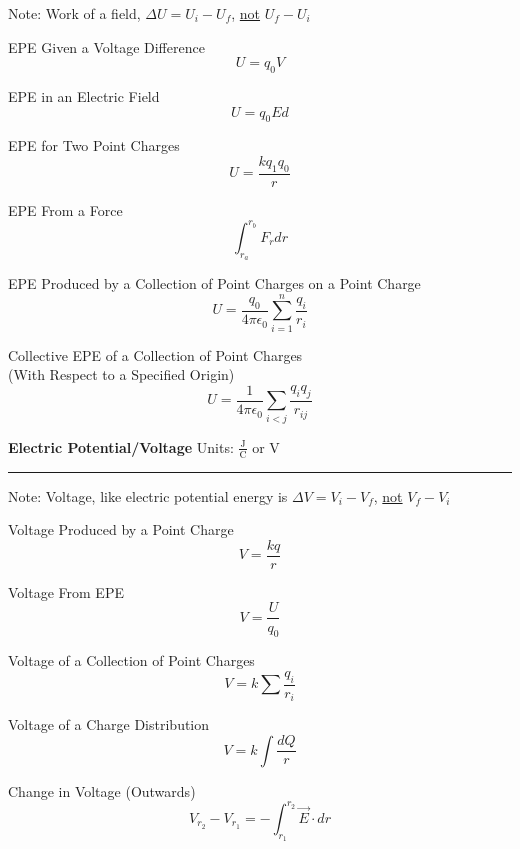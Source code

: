 \documentclass{article}
\begin{document}
\begin{center}

    Note: Work of a field, $\Delta U = U_i - U_f$, \underline{not} $U_f - U_i$
    
    \begin{multicols}{3}
        
        EPE Given a Voltage Difference
        \[
            U = q_0V
        \]
        
        EPE in an Electric Field
        \[
            U = q_0Ed
        \]
        
        EPE for Two Point Charges
        \[
            U = \frac{kq_1q_0}{r}
        \]
        
        
    \end{multicols}
    \begin{multicols}{3}
    
    EPE From a Force
        \[
            \int_{r_a}^{r_b}{F_r dr}
        \]
    
    \columnbreak
    
    EPE Produced by a Collection of Point Charges on a Point Charge
    \[
        U = \frac{q_0}{4\pi\epsilon_0} \sum_{i = 1}^{n}{\frac{q_i}{r_i}}
    \]
    
    Collective EPE of a Collection of Point Charges\\
    \footnotesize
    (With Respect to a Specified Origin)\normalsize
    \[
        U = \frac{1}{4\pi\epsilon_0}\sum_{i<j}{\frac{q_iq_j}{r_{ij}}}
    \]
    
    \end{multicols}
\end{center}
\medskip
\large \textbf{Electric Potential/Voltage}\normalsize \qquad
Units: $\frac{\textrm{J}}{\textrm{C}}$ or V\\
\noindent\rule{\textwidth}{0.5pt}
\begin{center}
    Note: Voltage, like electric potential energy is $\Delta V = V_i - V_f$, \underline{not} $V_f - V_i$
\end{center}
\begin{multicols}{5}
\begin{center}
Voltage Produced by a Point Charge
\[
    V = \frac{kq}{r}
\]

\vfill\null\columnbreak

Voltage From EPE
\[
    V = \frac{U}{q_0}
\]

\vfill\null\columnbreak

Voltage of a Collection of Point Charges
\[
    V = k \sum{\frac{q_i}{r_i}}
\]

Voltage of a Charge Distribution
\[
    V = k\int\frac{dQ}{r}
\]

Change in Voltage (Outwards)
\[
    V_{r_2}-V_{r_1} = -\int_{r_1}^{r_2}{\vec{E}\cdot dr}
\]
\end{center}
\end{multicols}
\end{document}
